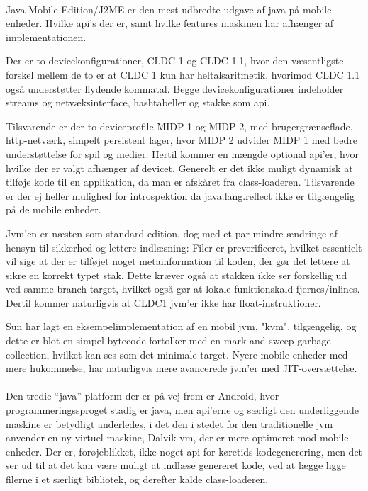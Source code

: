 \documentclass[12pt]{article}
\begin{document}
\paragraph{}
Java Mobile Edition/J2ME er den mest udbredte udgave af java på mobile enheder.
Hvilke api's der er, samt hvilke features maskinen har afhænger af implementationen. 

Der er to device\-konfigurationer, CLDC 1 og CLDC 1.1, hvor den væsentligste forskel mellem de to er at CLDC 1 kun har heltalsaritmetik, hvorimod CLDC 1.1 også understøtter flydende kommatal. Begge device\-konfigurationer indeholder streams og netvæksinterface, hashtabeller og stakke som api.

Tilsvarende er der to device\-profile MIDP 1 og MIDP 2, med brugergrænseflade, http-netværk, simpelt persistent lager, hvor MIDP 2 udvider MIDP 1 med bedre understøttelse for spil og medier. Hertil kommer en mængde optional api'er, hvor hvilke der er valgt afhænger af devicet.
Generelt er det ikke muligt dynamisk at tilføje kode til en applikation, da man er afskåret fra class-loaderen. Tilsvarende er der ej heller mulighed for introspektion da java.lang.reflect ikke er tilgængelig på de mobile enheder.

Jvm'en er næsten som standard edition, dog med et par mindre ændringe af hensyn til sikkerhed og lettere indlæsning: Filer er preverificeret, hvilket essentielt vil sige at der er tilføjet noget metainformation til koden, der gør det lettere at sikre en korrekt typet stak. Dette kræver også at stakken ikke ser forskellig ud ved samme branch-target, hvilket også gør at lokale funktionskald fjernes/inlines. Dertil kommer naturligvis at CLDC1 jvm'er ikke har float-instruktioner.

Sun har lagt en eksempelimplementation af en mobil jvm, "kvm", tilgængelig, og dette er blot en simpel bytecode-fortolker med en mark-and-sweep garbage collection, hvilket kan ses som det minimale target. Nyere mobile enheder med mere hukommelse, har naturligvis mere avancerede jvm'er med JIT-oversættelse.

\paragraph{}
Den tredie ``java'' platform der er på vej frem er Android, hvor programmeringssproget stadig er java, men api'erne og særligt den underliggende maskine er betydligt anderledes, i det den i stedet for den traditionelle jvm anvender en ny virtuel maskine, Dalvik vm, der er mere optimeret mod mobile enheder. Der er, forøjeblikket, ikke noget api for køretids kodegenerering, men det ser ud til at det kan være muligt at indlæse genereret kode, ved at lægge ligge filerne i et særligt bibliotek, og derefter kalde class-loaderen. 
\end{document}
